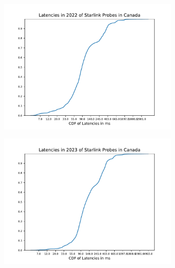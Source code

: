 \begin{figure}
	\centering
	\begin{subfigure}[b]{0.3\linewidth}
		\includegraphics[width=\linewidth]{chapters/4-results/latency/img/cdf_latencies_in_2022_of_starlink_probes_in_canada.pdf}
	\end{subfigure}
	\begin{subfigure}[b]{0.3\linewidth}
		\includegraphics[width=\linewidth]{chapters/4-results/latency/img/cdf_latencies_in_2023_of_starlink_probes_in_canada.pdf}
	\end{subfigure}
	\begin{subfigure}[b]{0.3\linewidth}

\end{subfigure}
\end{figure}
